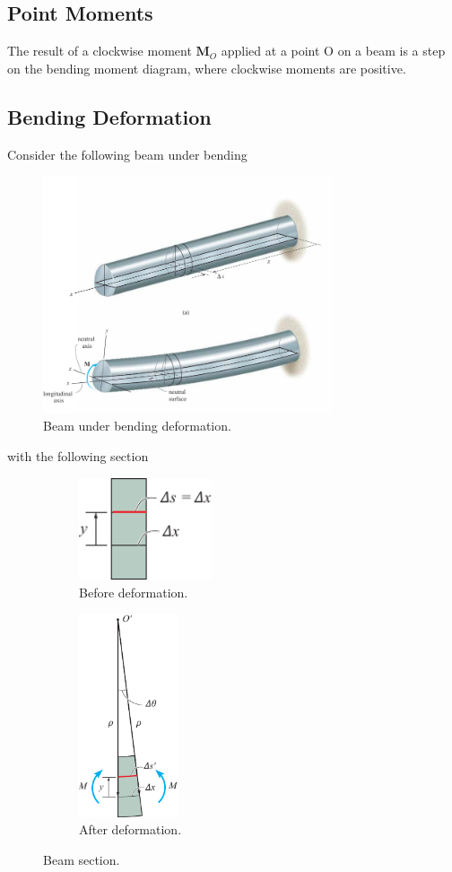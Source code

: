 \documentclass{article}
\begin{document}
\subsection{Point Moments}
The result of a clockwise moment \(\symbf{M}_O\) applied at a point O on a beam is a step on the bending
moment diagram, where clockwise moments are positive.
\subsection{Bending Deformation}
Consider the following beam under bending
\begin{figure}[H]
    \centering
    \includegraphics[height = 7cm, keepaspectratio = true]{figures/bending_deformation_diagram.pdf}
    \caption{Beam under bending deformation.} %
\end{figure}
with the following section
\begin{figure}[H]
    \centering
    \begin{subfigure}[c]{0.47\linewidth}
        \centering
        \includegraphics[height = 3cm, keepaspectratio = true]{figures/beam_section_before_bending.pdf}
        \caption{Before deformation.}
    \end{subfigure}
    \begin{subfigure}[c]{0.47\linewidth}
        \centering
        \includegraphics[height = 6cm, keepaspectratio = true]{figures/beam_section_after_bending.pdf}
        \caption{After deformation.}
    \end{subfigure}
    \caption{Beam section.} %
\end{figure}
\end{document}
